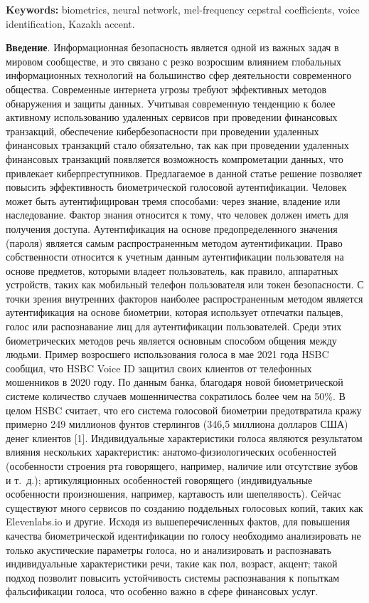{\bfseries Keywords:} biometrics, neural network, mel-frequency cepstral
coefficients, voice identification, Kazakh accent.

{\bfseries Введение}. Информационная безопасность является одной из важных
задач в мировом сообществе, и это связано с резко возросшим влиянием
глобальных информационных технологий на большинство сфер деятельности
современного общества. Современные интернета угрозы требуют эффективных
методов обнаружения и защиты данных. Учитывая современную тенденцию к
более активному использованию удаленных сервисов при проведении
финансовых транзакций, обеспечение кибербезопасности при проведении
удаленных финансовых транзакций стало обязательно, так как при
проведении удаленных финансовых транзакций появляется возможность
компрометации данных, что привлекает киберпреступников. Предлагаемое в
данной статье решение позволяет повысить эффективность биометрической
голосовой аутентификации. Человек может быть аутентифицирован тремя
способами: через знание, владение или наследование. Фактор знания
относится к тому, что человек должен иметь для получения доступа.
Аутентификация на основе предопределенного значения (пароля) является
самым распространенным методом аутентификации. Право собственности
относится к учетным данным аутентификации пользователя на основе
предметов, которыми владеет пользователь, как правило, аппаратных
устройств, таких как мобильный телефон пользователя или токен
безопасности. С точки зрения внутренних факторов наиболее
распространенным методом является аутентификация на основе биометрии,
которая использует отпечатки пальцев, голос или распознавание лиц для
аутентификации пользователей. Среди этих биометрических методов речь
является основным способом общения между людьми. Пример возросшего
использования голоса в мае 2021 года HSBC сообщил, что HSBC Voice ID
защитил своих клиентов от телефонных мошенников в 2020 году. По данным
банка, благодаря новой биометрической системе количество случаев
мошенничества сократилось более чем на 50\%. В целом HSBC считает, что
его система голосовой биометрии предотвратила кражу примерно 249
миллионов фунтов стерлингов (346,5 миллиона долларов США) денег клиентов
{[}1{]}. Индивидуальные характеристики голоса являются результатом
влияния нескольких характеристик: анатомо-физиологических особенностей
(особенности строения рта говорящего, например, наличие или отсутствие
зубов и т.~д.); артикуляционных особенностей говорящего (индивидуальные
особенности произношения, например, картавость или шепелявость). Сейчас
существуют много сервисов по созданию поддельных голосовых копий, таких
как Elevenlabs.io и другие. Исходя из вышеперечисленных фактов, для
повышения качества биометрической идентификации по голосу необходимо
анализировать не только акустические параметры голоса, но и
анализировать и распознавать индивидуальные характеристики речи, такие
как пол, возраст, акцент; такой подход позволит повысить устойчивость
системы распознавания к попыткам фальсификации голоса, что особенно
важно в сфере финансовых услуг.

